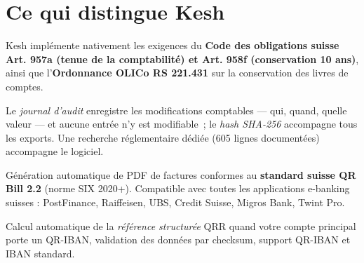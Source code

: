 \documentclass[a4paper,11pt,oneside]{article}
\begin{document}

\clearpage

\section*{\color{keshPrimary}Ce qui distingue Kesh}

\vspace{0.5cm}

\begin{tcolorbox}[%
    enhanced, breakable,
    colback=keshSurfaceAlt, colframe=keshPrimary,
    boxrule=0pt, leftrule=4pt, arc=4pt,
    title=\sffamily\bfseries\color{keshPrimary}{\faUniversity\ Conformité réglementaire suisse}
]
\sffamily
Kesh implémente nativement les exigences du \textbf{Code des obligations suisse Art. 957a (tenue de la comptabilité) et Art. 958f (conservation 10 ans)}, ainsi que l'\textbf{Ordonnance OLICo RS 221.431} sur la conservation des livres de comptes.

Le \emph{journal d'audit} enregistre les modifications comptables --- qui, quand, quelle valeur --- et aucune entrée n'y est modifiable~; le \emph{hash SHA-256} accompagne tous les exports. Une recherche réglementaire dédiée (605 lignes documentées) accompagne le logiciel.
\end{tcolorbox}

\vspace{0.3cm}

\begin{tcolorbox}[%
    enhanced, breakable,
    colback=keshSurfaceAlt, colframe=keshSuccess,
    boxrule=0pt, leftrule=4pt, arc=4pt,
    title=\sffamily\bfseries\color{keshSuccess}{\faQrcode\ QR Bill 2.2 natif}
]
\sffamily
Génération automatique de PDF de factures conformes au \textbf{standard suisse QR Bill 2.2} (norme SIX 2020+). Compatible avec toutes les applications e-banking suisses : PostFinance, Raiffeisen, UBS, Credit Suisse, Migros Bank, Twint Pro.

Calcul automatique de la \emph{référence structurée} QRR quand votre compte principal porte un QR-IBAN, validation des données par checksum, support QR-IBAN et IBAN standard.
\end{tcolorbox}

\vspace{0.3cm}
\end{document}
